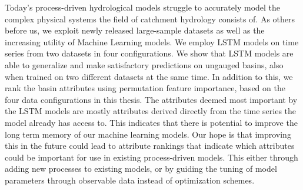 Today's process-driven hydrological models struggle to accurately model the complex physical 
systems the field of catchment hydrology consists of. 
As others before us, we exploit newly released large-sample datasets as well as the increasing utility 
of Machine Learning models. 
We employ LSTM models on time series from two datasets in four configurations. 
We show that LSTM models are able to generalize and make satisfactory predictions on ungauged basins, also when 
trained on two different datasets at the same time. 
In addition to this, we rank the basin attributes using permutation feature importance, 
based on the four data configurations in this thesis. 
The attributes deemed most important by the LSTM models are mostly attributes derived 
directly from the time series the model already has access to. This indicates that 
there is potential to improve the long term memory of our machine learning models.
Our hope is that improving this in the future could lead to attribute rankings 
that indicate which attributes could be important for use in existing process-driven 
models. This either through adding new processes to existing models, or by guiding the 
tuning of model parameters through observable data instead of optimization schemes.
